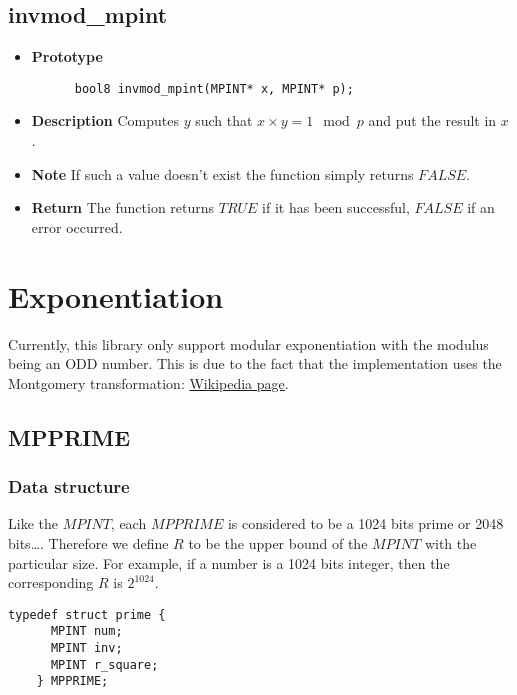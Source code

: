 \documentclass[10pt,a4paper]{article}
\begin{document}
  \subsection{invmod\_mpint}
  
  \begin{itemize}
    \item [] \textbf{Prototype}
    \begin{lstlisting}
      bool8 invmod_mpint(MPINT* x, MPINT* p);
    \end{lstlisting}
    \item [] \textbf{Description} Computes $y$ such that $x \times y = 1 \mod p$ and put the result in $x$.
    \item [] \textbf{Note} If such a value doesn't exist the function simply returns $FALSE$.
    \item [] \textbf{Return} The function returns $TRUE$ if it has been successful, $FALSE$ if an error occurred.
  \end{itemize}
  
  \section{Exponentiation}
  
  Currently, this library only support modular exponentiation with the modulus being an ODD number. This is due to the fact that the implementation uses the
  Montgomery transformation: \href{http://en.wikipedia.org/wiki/Montgomery_modular_multiplication}{Wikipedia page}.
  
  \subsection{MPPRIME} \label{prime}
  
  \subsubsection{Data structure}
  
  Like the $MPINT$, each $MPPRIME$ is considered to be a 1024 bits prime or 2048 bits\dots. Therefore we define $R$ to be the upper bound of the $MPINT$ with the particular size. For example,
  if a number is a 1024 bits integer, then the corresponding $R$ is $2^{1024}$.
  
  \begin{lstlisting}[caption= MPPRIME structure, label = mpprime]
    typedef struct prime {
      MPINT num;
      MPINT inv;
      MPINT r_square;
    } MPPRIME;
  \end{lstlisting}
  
\end{document}
